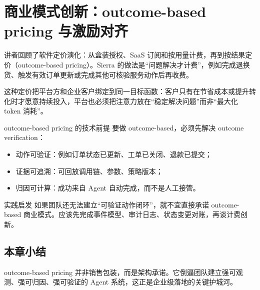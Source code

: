 \section{商业模式创新：outcome-based pricing 与激励对齐}

讲者回顾了软件定价演化：从盒装授权、SaaS 订阅和按用量计费，再到按结果定价（outcome-based pricing）。Sierra 的做法是“问题解决才计费”，例如完成退换货、触发有效订单更新或完成其他可核验服务动作后再收费。

这种定价把平台方和企业客户绑定到同一目标函数：客户只有在节省成本或提升转化时才愿意持续投入，平台也必须把注意力放在“稳定解决问题”而非“最大化 token 消耗”。

\begin{knowledgebox}{outcome-based pricing 的技术前提}
要做 outcome-based，必须先解决 outcome verification：
\begin{itemize}[leftmargin=1.5em]
    \item 动作可验证：例如订单状态已更新、工单已关闭、退款已提交；
    \item 证据可追溯：可回放调用链、参数、策略版本；
    \item 归因可计算：成功来自 Agent 自动完成，而不是人工接管。
\end{itemize}
\end{knowledgebox}

\begin{importantbox}{实践启发}
如果团队还无法建立“可验证动作闭环”，就不宜直接承诺 outcome-based 商业模式。应该先完成事件模型、审计日志、状态变更对账，再谈计费创新。
\end{importantbox}

\subsection{本章小结}

outcome-based pricing 并非销售包装，而是架构承诺。它倒逼团队建立强可观测、强可归因、强可验证的 Agent 系统，这正是企业级落地的关键护城河。

